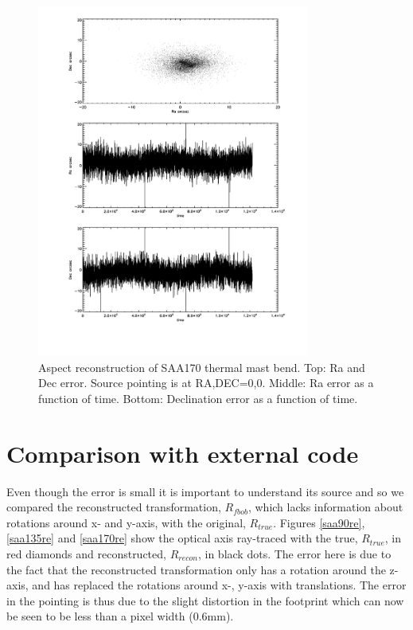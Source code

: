 \begin{figure}[tb]
\begin{center}
\includegraphics[width=0.8\textwidth]{images/saa170.pdf}
\caption{Aspect reconstruction of SAA170 thermal mast bend. Top: Ra and Dec error. Source pointing is at RA,DEC=0,0. Middle: Ra error as a function of time. Bottom: Declination error as a function of time. }
\label{saa170nusim}
\end{center}
\end{figure}

\section{Comparison with external code}

Even though the error is small it is important to understand its source and so we compared the reconstructed transformation, $R_{fbob}$, which lacks information about rotations around x- and y-axis, with the original, $R_{true}$. Figures \ref{saa90re}, \ref{saa135re} and \ref{saa170re} show the optical axis ray-traced with the true, $R_{true}$, in red diamonds and reconstructed, $R_{recon}$, in black dots. The error here is due to the fact that the reconstructed transformation only has a rotation around the z-axis, and has replaced the rotations around x-, y-axis with translations. The error in the pointing is thus due to the slight distortion in the footprint which can now be seen to be less than a pixel width (0.6mm).

